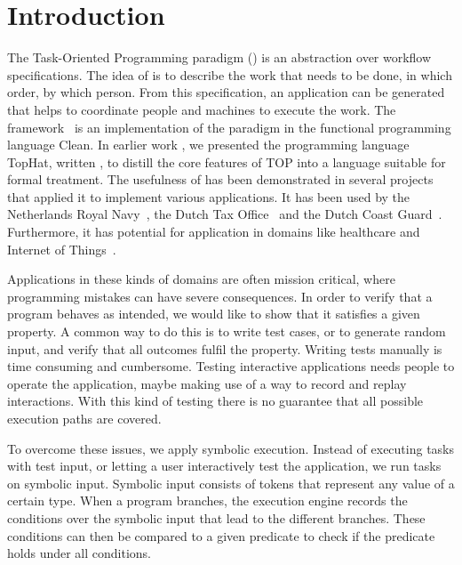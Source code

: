 
\section{Introduction}

The Task-Oriented Programming paradigm (\TOP) is an abstraction over workflow specifications.
The idea of \TOP is to describe the work that needs to be done, in which order, by which person.
From this specification, an application can be generated that helps to coordinate people and machines to execute the work.
The \ITASKS framework~\cite{DBLP:conf/ppdp/PlasmeijerLMAK12} is an implementation of the paradigm in the functional programming language Clean.
In earlier work \cite{Steenvoorden2019}, we presented the programming language TopHat, written \TOPHAT, to distill the core features of TOP into a language suitable for formal treatment.
The usefulness of \TOP has been demonstrated in several projects that applied it to implement various applications.
It has been used by the Netherlands Royal Navy~\cite{jansen2018dynamic}, the Dutch Tax Office~\cite{conf/sfp/StutterheimAP17} and the Dutch Coast Guard~\cite{lijnse2012incidone}. %
Furthermore, it has potential for application in domains like healthcare and Internet of Things~\cite{DBLP:conf/cgo/KoopmanLP18}.

Applications in these kinds of domains are often mission critical, where programming mistakes can have severe consequences.
In order to verify that a \TOPHAT program behaves as intended, we would like to show that it satisfies a given property.
A common way to do this is to write test cases, or to generate random input, and verify that all outcomes fulfil the property.
Writing tests manually is time consuming and cumbersome.
Testing interactive applications needs people to operate the application, maybe making use of a way to record and replay interactions.
With this kind of testing there is no guarantee that all possible execution paths are covered.

To overcome these issues, we apply symbolic execution.
Instead of executing tasks with test input, or letting a user interactively test the application,
we run tasks on symbolic input.
Symbolic input consists of tokens that represent any value of a certain type.
When a program branches, the execution engine records the conditions over the symbolic input that lead to the different branches.
These conditions can then be compared to a given predicate to check if the predicate holds under all conditions.

